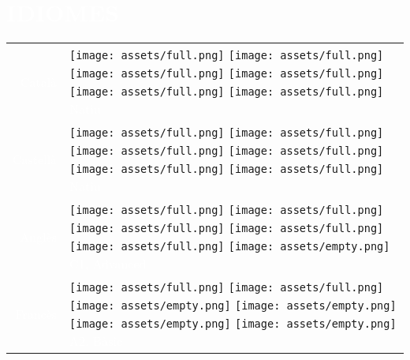 \documentclass[../main.tex]{subfiles}
\begin{document}
    \vspace*{0.25cm}\section*{\hspace*{0.4cm}\textcolor{white}{IDIOMES}}
    \vspace*{-0.15cm}
    \begin{tabular}{r l}
    \hspace*{0.5cm}
    \textcolor{white}{\vspace*{0.1cm}Català} &            
            \texttt{[image: assets/full.png]}
            \texttt{[image: assets/full.png]}
            \texttt{[image: assets/full.png]}
            \texttt{[image: assets/full.png]}
            \texttt{[image: assets/full.png]}
            \texttt{[image: assets/full.png]}
            \textcolor{white}{\hspace*{0.05cm} Natiu}\\ 
    \textcolor{white}{\vspace*{0.1cm}Castellà} &
            \texttt{[image: assets/full.png]}
            \texttt{[image: assets/full.png]}
            \texttt{[image: assets/full.png]}
            \texttt{[image: assets/full.png]}
            \texttt{[image: assets/full.png]}
            \texttt{[image: assets/full.png]}
            \textcolor{white}{\hspace*{0.05cm} Natiu}\\
    \textcolor{white}{\vspace*{0.1cm}Anglès} &
            \texttt{[image: assets/full.png]}
            \texttt{[image: assets/full.png]}
            \texttt{[image: assets/full.png]}
            \texttt{[image: assets/full.png]}
            \texttt{[image: assets/full.png]}
            \texttt{[image: assets/empty.png]}
            \textcolor{white}{\hspace*{0.05cm} C1, Advanced}\\
    \textcolor{white}{Francès} &
            \texttt{[image: assets/full.png]}
            \texttt{[image: assets/full.png]}
            \texttt{[image: assets/empty.png]}
            \texttt{[image: assets/empty.png]}
            \texttt{[image: assets/empty.png]}
            \texttt{[image: assets/empty.png]}
            \textcolor{white}{\hspace*{0.05cm} A2, Bàsic}\\
    \end{tabular}
\end{document}
